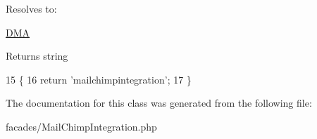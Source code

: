 Resolves to\+:
\begin{DoxyItemize}
\item \hyperlink{namespaceDMA}{D\+M\+A}
\end{DoxyItemize}

\begin{DoxyReturn}{Returns}
string 
\end{DoxyReturn}

\begin{DoxyCode}
15                                                  \{ 
16         \textcolor{keywordflow}{return} \textcolor{stringliteral}{'mailchimpintegration'};
17     \}
\end{DoxyCode}


The documentation for this class was generated from the following file\+:\begin{DoxyCompactItemize}
\item 
facades/Mail\+Chimp\+Integration.\+php\end{DoxyCompactItemize}
